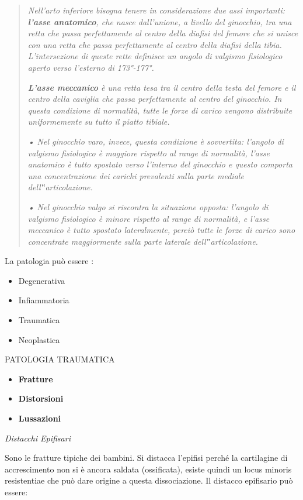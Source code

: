 \documentclass[]{article}
\begin{document}
\begin{quote}
\emph{Nell'arto inferiore bisogna tenere in considerazione due assi
importanti: \textbf{l'asse anatomico}, che nasce dall'unione, a livello
del ginocchio, tra una retta che passa perfettamente al centro della
diafisi del femore che si unisce con una retta che passa perfettamente
al centro della diafisi della tibia. L'intersezione di queste rette
definisce un angolo di valgismo fisiologico aperto verso l'esterno di
173°-177°.}

\emph{\textbf{L'asse meccanico} è una retta tesa tra il centro della
testa del femore e il centro della caviglia che passa perfettamente al
centro del ginocchio. In questa condizione di normalità, tutte le forze
di carico vengono distribuite uniformemente su tutto il piatto tibiale.
}

\emph{• Nel ginocchio varo, invece, questa condizione è sovvertita:
l'angolo di valgismo fisiologico è maggiore rispetto al range di
normalità, l'asse anatomico è tutto spostato verso l'interno del
ginocchio e questo comporta una concentrazione dei carichi prevalenti
sulla parte mediale dell‟articolazione. }

\emph{• Nel ginocchio valgo si riscontra la situazione opposta: l'angolo
di valgismo fisiologico è minore rispetto al range di normalità, e
l'asse meccanico è tutto spostato lateralmente, perciò tutte le forze di
carico sono concentrate maggiormente sulla parte laterale
dell‟articolazione.}
\end{quote}

La patologia può essere :

\begin{itemize}
\item
  Degenerativa
\item
  Infiammatoria
\item
  Traumatica
\item
  Neoplastica
\end{itemize}

PATOLOGIA TRAUMATICA

\begin{itemize}
\item
  \textbf{Fratture }
\item
  \textbf{Distorsioni }
\item
  \textbf{Lussazioni }
\end{itemize}

\emph{Distacchi Epifisari}

Sono le fratture tipiche dei bambini. Si distacca l'epifisi perché la
cartilagine di accrescimento non si è ancora saldata (ossificata),
esiste quindi un locus minoris resistentiae che può dare origine a
questa dissociazione. Il distacco epifisario può essere:
\end{document}
